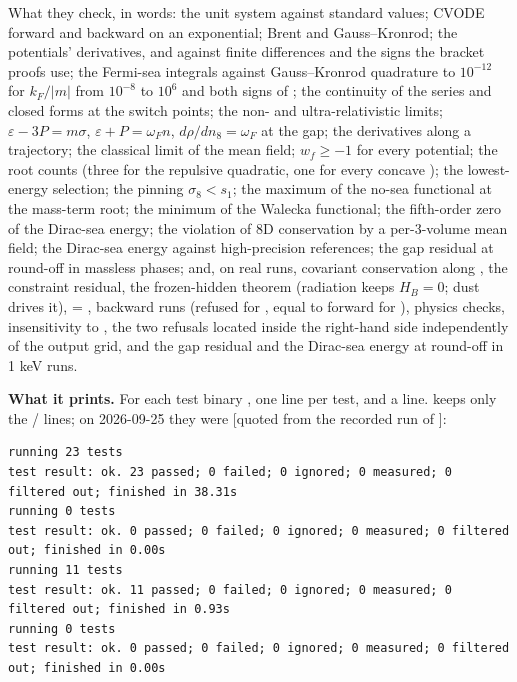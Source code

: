 What they check, in words: the unit system against standard values; CVODE forward and backward on an exponential; Brent and Gauss--Kronrod; the potentials' derivatives,  and  against finite differences and the signs the bracket proofs use; the Fermi-sea integrals against Gauss--Kronrod quadrature to $10^{-12}$ for $k_F/|m|$ from $10^{-8}$ to $10^{6}$ and both signs of ; the continuity of the series and closed forms at the switch points; the non- and ultra-relativistic limits; $\varepsilon - 3P = m \sigma$, $\varepsilon + P = \omega_F n$, $d \rho/d n_8 = \omega_F$ at the gap; the derivatives along a trajectory; the classical limit of the mean field; $w_f \geq -1$ for every potential; the root counts (three for the repulsive quadratic, one for every concave ); the lowest-energy selection; the  pinning $\sigma_8 < s_1$; the maximum of the no-sea functional at the mass-term root; the minimum of the Walecka functional; the fifth-order zero of the Dirac-sea energy; the violation of 8D conservation by a per-3-volume mean field; the Dirac-sea energy against high-precision references; the gap residual at round-off in massless phases; and, on real runs, covariant conservation along , the constraint residual, the frozen-hidden theorem (radiation keeps $H_B = 0$; dust drives it),  = , backward runs (refused for , equal to forward for ), physics checks, insensitivity to , the two refusals located inside the right-hand side independently of the output grid, and the gap residual and the Dirac-sea energy at round-off in 1 keV runs.

\textbf{What it prints.} For each test binary , one  line per test, and a  line.  keeps only the / lines; on 2026-09-25 they were [quoted from the recorded run of ]:

\begin{Verbatim}
running 23 tests
test result: ok. 23 passed; 0 failed; 0 ignored; 0 measured; 0 filtered out; finished in 38.31s
running 0 tests
test result: ok. 0 passed; 0 failed; 0 ignored; 0 measured; 0 filtered out; finished in 0.00s
running 11 tests
test result: ok. 11 passed; 0 failed; 0 ignored; 0 measured; 0 filtered out; finished in 0.93s
running 0 tests
test result: ok. 0 passed; 0 failed; 0 ignored; 0 measured; 0 filtered out; finished in 0.00s
\end{Verbatim}

